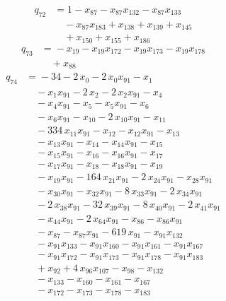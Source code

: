 \documentclass[11pt]{article}
\theoremstyle{remark}\newtheorem{remark}[theorem]{Remark}
\begin{document}
\begin{align*}
q_{72} &={}1 -x_{87} -x_{87}x_{132} -x_{87}x_{133}\\
&\quad -x_{87}x_{183} +x_{138} +x_{139} +x_{145}\\
&\quad +x_{150} +x_{155} +x_{186}
\end{align*}
\begin{align*}
q_{73} &={}-x_{19} -x_{19}x_{172} -x_{19}x_{173} -x_{19}x_{178}\\
&\quad +x_{88}
\end{align*}
\begin{align*}
q_{74} &={}-34 -2\,x_{0} -2\,x_{0}x_{91} -x_{1}\\
&\quad -x_{1}x_{91} -2\,x_{2} -2\,x_{2}x_{91} -x_{4}\\
&\quad -x_{4}x_{91} -x_{5} -x_{5}x_{91} -x_{6}\\
&\quad -x_{6}x_{91} -x_{10} -2\,x_{10}x_{91} -x_{11}\\
&\quad -334\,x_{11}x_{91} -x_{12} -x_{12}x_{91} -x_{13}\\
&\quad -x_{13}x_{91} -x_{14} -x_{14}x_{91} -x_{15}\\
&\quad -x_{15}x_{91} -x_{16} -x_{16}x_{91} -x_{17}\\
&\quad -x_{17}x_{91} -x_{18} -x_{18}x_{91} -x_{19}\\
&\quad -x_{19}x_{91} -164\,x_{21}x_{91} -2\,x_{24}x_{91} -x_{28}x_{91}\\
&\quad -x_{30}x_{91} -x_{32}x_{91} -8\,x_{33}x_{91} -2\,x_{34}x_{91}\\
&\quad -2\,x_{38}x_{91} -32\,x_{39}x_{91} -8\,x_{40}x_{91} -2\,x_{41}x_{91}\\
&\quad -x_{44}x_{91} -2\,x_{64}x_{91} -x_{86} -x_{86}x_{91}\\
&\quad -x_{87} -x_{87}x_{91} -619\,x_{91} -x_{91}x_{132}\\
&\quad -x_{91}x_{133} -x_{91}x_{160} -x_{91}x_{161} -x_{91}x_{167}\\
&\quad -x_{91}x_{172} -x_{91}x_{173} -x_{91}x_{178} -x_{91}x_{183}\\
&\quad +x_{92} +4\,x_{96}x_{107} -x_{98} -x_{132}\\
&\quad -x_{133} -x_{160} -x_{161} -x_{167}\\
&\quad -x_{172} -x_{173} -x_{178} -x_{183}
\end{align*}
\end{document}
